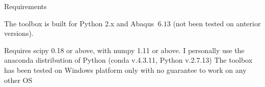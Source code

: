\begin{frame}{Requirements}

\vfill
The toolbox is built for Python 2.x and Abaqus $\>6.13$ (not been tested on anterior versions).

Requires scipy 0.18 or above, with numpy 1.11 or above.
\vfill
I personally use the anaconda distribution of Python (conda v.4.3.11, Python v.2.7.13)
\vfill
The toolbox has been tested on Windows platform only with no guarantee to work on any other OS
\vfill

\end{frame}